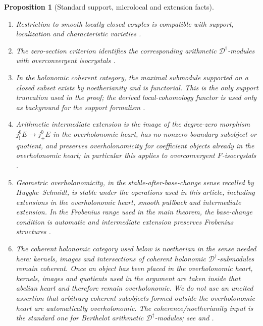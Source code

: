 \documentclass[11pt]{amsart}
\theoremstyle{plain}
\newtheorem{proposition}{Proposition}[section]
\theoremstyle{definition}
\theoremstyle{remark}
\begin{document}
\begin{proposition}[Standard support, microlocal and extension facts]
\begin{enumerate}[label=\textup{(\roman*)}]
The direction is important.  Caro's 2009 overholonomicity paper \cite{CaroSurholonomie} supplies the
overholonomic category and its stability properties, and the converse implication
that overholonomic objects are holonomic in the cases treated there; it is not
the input for the holonomic \(\Rightarrow\) overholonomic implication used here.
That implication is the smooth-projective Frobenius result of
\cite[\S2.1]{CaroStabiliteHolonomie}.
\item Restriction to smooth locally closed couples is compatible with support,
localization and characteristic varieties
\cite[\S2.1, Lemmas 2.1.1--2.1.2]{HuygheSchmidtIntermediate}.
\item The zero-section criterion identifies the corresponding arithmetic
\(\mathscr D^\dagger\)-modules with overconvergent isocrystals
\cite[Theorem 2.1.4]{HuygheSchmidtIntermediate}.
\item In the holonomic coherent category, the maximal submodule supported on a closed
subset exists by noetherianity and is functorial.  This is the only support
truncation used in the proof; the derived local-cohomology functor is used only
as background for the support formalism
\cite[Th\'eor\`eme 2.2.14]{CaroHolonomieSansFrobenius}.
\item Arithmetic intermediate extension is the image of the degree-zero morphism
\(j^0_!E\to j^0_+E\) in the overholonomic heart, has no nonzero boundary
subobject or quotient, and preserves overholonomicity for coefficient objects
already in the overholonomic heart; in particular this applies to
overconvergent \(F\)-isocrystals
\cite[\S2.2, definition of \(u_{!+}\), and Proposition 2.3.3]{HuygheSchmidtIntermediate}.
\item Geometric overholonomicity, in the stable-after-base-change sense recalled by
Huyghe--Schmidt, is stable under the operations used in this article, including
extensions in the overholonomic heart, smooth pullback and intermediate
extension.  In the Frobenius range used in the main theorem, the base-change
condition is automatic and intermediate extension preserves Frobenius structures
\cite[\S2.1, first paragraphs; \S2.2; and Proposition 2.3.3]{HuygheSchmidtIntermediate}.

\item The coherent holonomic category used below is noetherian in the sense
needed here: kernels, images and intersections of coherent holonomic
\(\mathscr D^\dagger\)-submodules remain coherent.  Once an object has been
placed in the overholonomic heart, kernels, images and quotients used in the
argument are taken inside that abelian heart and therefore remain
overholonomic.  We do not use an uncited assertion that arbitrary coherent
subobjects formed outside the overholonomic heart are automatically
overholonomic.  The coherence/noetherianity input is the standard one for
Berthelot arithmetic \(\mathscr D^\dagger\)-modules; see
\cite[\S2.1, Lemmas 2.1.1--2.1.2]{HuygheSchmidtIntermediate} and
\cite[Th\'eor\`eme 2.2.14]{CaroHolonomieSansFrobenius}.
\end{enumerate}
\end{proposition}
\end{document}
